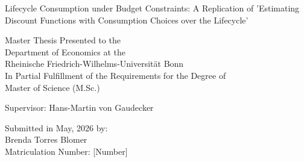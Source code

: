 \documentclass[12pt, a4paper, leqno]{article}
\begin{document}
\begin{titlepage}
    \centering
    \vspace*{3cm}
    {\large Lifecycle Consumption under Budget Constraints: A Replication of 'Estimating Discount Functions with Consumption Choices over the Lifecycle' \par}
    \vspace{2cm}
    {\normalsize
    Master Thesis Presented to the \\
    Department of Economics at the \\
    Rheinische Friedrich-Wilhelms-Universität Bonn \\[1em]
    In Partial Fulfillment of the Requirements for the Degree of \\
    Master of Science (M.Sc.) \par}
    \vspace{2cm}
    {\normalsize Supervisor: Hans-Martin von Gaudecker \par}
    \vspace{1cm}
    {\normalsize Submitted in May, 2026 by: \\[0.5em]
    Brenda Torres Blomer \\
    Matriculation Number: [Number] \par}
\end{titlepage}

\tableofcontents
\newpage


\setcounter{page}{1}


\newpage
\printbibliography

\newpage
\appendix
{}
\setcounter{page}{1}
\end{document}
